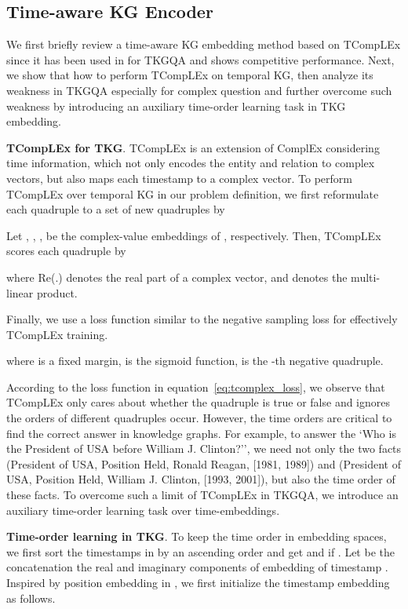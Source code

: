 \documentclass[11pt]{article}
\newcommand{\xhdr}[1]{{\noindent\bfseries #1}.}
\begin{document}
\subsection{Time-aware KG Encoder}

We first briefly review a time-aware KG embedding method based on TCompLEx \cite{lacroix2020tensor} since it has been used in \cite{saxena2021question} for TKGQA and shows competitive performance. Next, we show that how to perform TCompLEx on temporal KG, then analyze its weakness in TKGQA especially for complex question and further overcome such weakness by introducing an auxiliary time-order learning task in TKG embedding.




\xhdr{TCompLEx for TKG} TCompLEx is an extension of ComplEx considering time information, which not only encodes the entity and relation to complex vectors, but also maps each timestamp to a complex vector. To perform TCompLEx over temporal KG in our problem definition, we first reformulate each quadruple to a set of new quadruples by



Let , , ,  be the complex-value embeddings of , respectively. Then, TCompLEx scores each quadruple  by

where Re(.) denotes the real part of a complex vector, and  denotes the multi-linear product.


Finally, we use a loss function similar to the negative sampling loss for effectively TCompLEx training.

where  is a fixed margin,  is the sigmoid function,  is the -th negative quadruple.

According to the loss function in equation~\ref{eq:tcomplex_loss}, we observe that TCompLEx only cares about whether the quadruple is true or false and ignores the orders of different quadruples occur. However, the time orders are critical to find the correct answer in knowledge graphs. For example, to answer the `Who is the President of USA before William J. Clinton?'', we need not only the two facts (President of USA, Position Held, Ronald Reagan, [1981, 1989]) and (President of USA, Position Held, William J. Clinton, [1993, 2001]), but also the time order of these facts. To overcome such a limit of TCompLEx in TKGQA, we introduce an auxiliary time-order learning task over time-embeddings.




\xhdr{Time-order learning in TKG} To keep the time order in embedding spaces, we first sort the timestamps in  by an ascending order and get  and  if . Let  be the concatenation the real and imaginary components of embedding  of timestamp . Inspired by position embedding in \cite{vaswani2017attention}, we first initialize the timestamp embedding  as follows.
\end{document}
